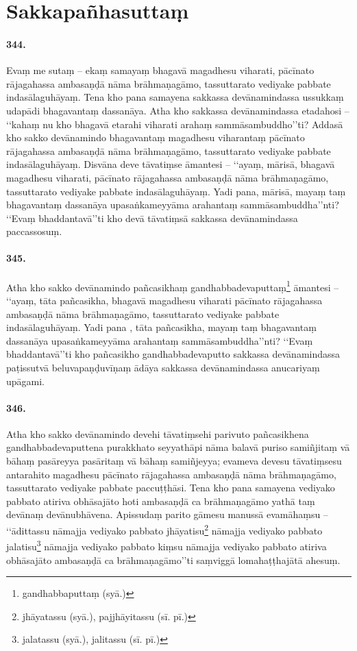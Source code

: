 \section{Sakkapañhasuttaṃ}

\paragraph{344.} Evaṃ me sutaṃ – ekaṃ samayaṃ bhagavā magadhesu viharati, pācīnato rājagahassa ambasaṇḍā nāma brāhmaṇagāmo, tassuttarato vediyake pabbate indasālaguhāyaṃ. Tena kho pana samayena sakkassa devānamindassa ussukkaṃ udapādi bhagavantaṃ dassanāya. Atha kho sakkassa devānamindassa etadahosi – ‘‘kahaṃ nu kho bhagavā etarahi viharati arahaṃ sammāsambuddho’’ti? Addasā kho sakko devānamindo bhagavantaṃ magadhesu viharantaṃ pācīnato rājagahassa ambasaṇḍā nāma brāhmaṇagāmo, tassuttarato vediyake pabbate indasālaguhāyaṃ. Disvāna deve tāvatiṃse āmantesi – ‘‘ayaṃ, mārisā, bhagavā magadhesu viharati, pācīnato rājagahassa ambasaṇḍā nāma brāhmaṇagāmo, tassuttarato vediyake pabbate indasālaguhāyaṃ. Yadi pana, mārisā, mayaṃ taṃ bhagavantaṃ dassanāya upasaṅkameyyāma arahantaṃ sammāsambuddha’’nti? ‘‘Evaṃ bhaddantavā’’ti kho devā tāvatiṃsā sakkassa devānamindassa paccassosuṃ.

\paragraph{345.} Atha kho sakko devānamindo pañcasikhaṃ gandhabbadevaputtaṃ\footnote{gandhabbaputtaṃ (syā.)} āmantesi – ‘‘ayaṃ, tāta pañcasikha, bhagavā magadhesu viharati pācīnato rājagahassa ambasaṇḍā nāma brāhmaṇagāmo, tassuttarato vediyake pabbate indasālaguhāyaṃ. Yadi pana , tāta pañcasikha, mayaṃ taṃ bhagavantaṃ dassanāya upasaṅkameyyāma arahantaṃ sammāsambuddha’’nti? ‘‘Evaṃ bhaddantavā’’ti kho pañcasikho gandhabbadevaputto sakkassa devānamindassa paṭissutvā beluvapaṇḍuvīṇaṃ ādāya sakkassa devānamindassa anucariyaṃ upāgami.

\paragraph{346.} Atha kho sakko devānamindo devehi tāvatiṃsehi parivuto pañcasikhena gandhabbadevaputtena purakkhato seyyathāpi nāma balavā puriso samiñjitaṃ vā bāhaṃ pasāreyya pasāritaṃ vā bāhaṃ samiñjeyya; evameva devesu tāvatiṃsesu antarahito magadhesu pācīnato rājagahassa ambasaṇḍā nāma brāhmaṇagāmo, tassuttarato vediyake pabbate paccuṭṭhāsi. Tena kho pana samayena vediyako pabbato atiriva obhāsajāto hoti ambasaṇḍā ca brāhmaṇagāmo yathā taṃ devānaṃ devānubhāvena. Apissudaṃ parito gāmesu manussā evamāhaṃsu – ‘‘ādittassu nāmajja vediyako pabbato jhāyatisu\footnote{jhāyatassu (syā.), pajjhāyitassu (sī. pī.)} nāmajja vediyako pabbato jalatisu\footnote{jalatassu (syā.), jalitassu (sī. pī.)} nāmajja vediyako pabbato kiṃsu nāmajja vediyako pabbato atiriva obhāsajāto ambasaṇḍā ca brāhmaṇagāmo’’ti saṃviggā lomahaṭṭhajātā ahesuṃ.

